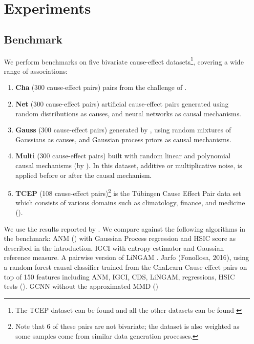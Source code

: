 \chapter{Experiments}


\section{Benchmark}

We perform benchmarks on five bivariate cause-effect datasets\footnote{ The TCEP dataset 
can be found \href{https://webdav.tuebingen.mpg.de/cause-effect/}{\color{blue}{here}} and 
all the other datasets can be found 
\href{https://dataverse.harvard.edu/dataset.xhtml?persistentId=doi:10.7910/DVN/3757KX}{\color{blue}{here}}
}, covering a wide range of associations:

\begin{enumerate}[noitemsep, topsep=0pt]

    \item \textbf{Cha} (300 cause-effect pairs) pairs from the challenge of \cite{chalearn}.
    \item \textbf{Net} (300 cause-effect pairs) artificial cause-effect pairs generated using 
            random distributions as causes, and neural networks as causal mechanisms.
    \item \textbf{Gauss} (300 cause-effect pairs) generated by \cite{Mooij2016jmlr}, using random 
      mixtures of Gaussians as causes, and Gaussian process priors as causal mechanisms.
    \item \textbf{Multi} (300 cause-effect pairs) built with random linear and 
    polynomial causal mechanisms (by \cite{goudet2017causal}). In this dataset, 
    additive or multiplicative noise, is applied before or after the causal mechanism.
    \item \textbf{TCEP} (108 cause-effect pairs)\footnote{Note that 6 of these pairs are not bivariate; the 
    dataset is also weighted as some samples come from similar data generation processes. } 
     is the Tübingen Cause Effect Pair data set which consists of various 
    domains such as climatology, finance, and medicine (\cite{Mooij2016jmlr}).

\end{enumerate}

We use the results reported by \cite{goudet2017causal}. We compare against the following algorithms
in the benchmark: ANM (\cite{Mooij2016jmlr}) with Gaussian Process regression and HSIC score as described 
in the introduction. IGCI \cite{daniusis2012inferring} with entropy estimator and Gaussian reference measure.
A  pairwise version of LiNGAM \cite{shimizu2011directlingam}.  Jarfo (Fonollosa, 2016), using a random forest 
causal classifier trained from the ChaLearn Cause-effect pairs on top of 150 features including ANM, IGCI,
CDS, LiNGAM, regressions, HSIC tests (\cite{fonollosa2019conditional}). GCNN without the approximated MMD (\cite{goudet2017causal})



